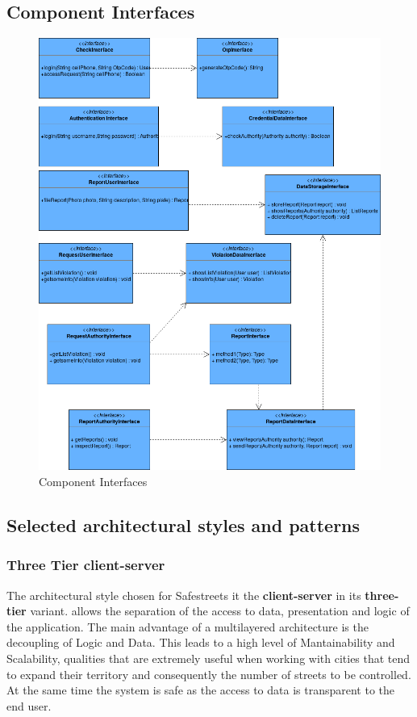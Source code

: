 \newpage
\subsection{Component Interfaces}
\begin{figure}[H]
		\includegraphics[width=\textwidth]{Images/ComponentInterfaces.png}		
		\caption{\label{fig:ComponentInterfaces}Component Interfaces}
	\end{figure}
\newpage
\subsection{Selected architectural styles and patterns}

\subsubsection{Three Tier client-server}

The architectural style chosen for Safestreets it the \textbf{client-server} in its \textbf{three-tier} variant.  allows the 
separation of the access to data, presentation and logic of the application.
The main advantage of a multilayered architecture is the decoupling of Logic and Data. This leads to a high level of Mantainability and Scalability, 
qualities that are extremely useful when working with cities that tend to expand their territory and consequently the number of streets to be controlled.
At the same time the system is safe as the access to data is transparent to the end user.

